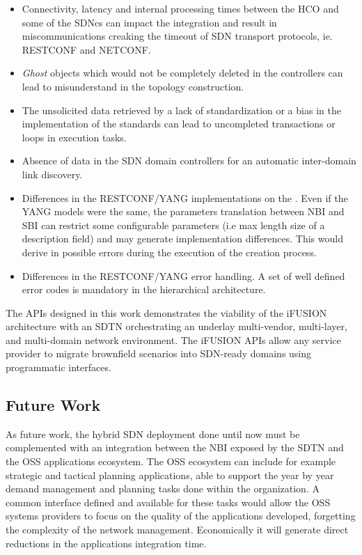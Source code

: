 \documentclass[10pt, conference]{IEEEtran}
\begin{document}
\begin{itemize}
    \item Connectivity, latency and internal processing times between the HCO and some of the SDNcs can impact the integration and result in miscommunications creaking the timeout of SDN transport protocols, ie. RESTCONF and NETCONF.   
    \item \textit{Ghost} objects which would not be completely deleted in the controllers can lead to misunderstand in the topology construction.
    \item The unsolicited data retrieved by a lack of standardization or a bias in the implementation of the standards can lead to uncompleted transactions or loops in execution tasks.
    \item Absence of data in the SDN domain controllers for an automatic inter-domain link discovery.
    \item Differences in the RESTCONF/YANG implementations on the . Even if the YANG models were the same, the parameters translation between NBI and SBI can restrict some configurable parameters (i.e max length size of a description field) and may generate implementation differences. This would derive in possible errors during the execution of the creation process.
    \item Differences in the RESTCONF/YANG error handling. A set of well defined error codes is mandatory in the hierarchical architecture.
\end{itemize}

The APIs designed in this work demonstrates the viability of the i\uppercase{FUSION} architecture with an SDTN  orchestrating an underlay multi-vendor, multi-layer, and multi-domain network environment. The i\uppercase{FUSION} APIs allow any service provider to migrate brownfield scenarios into SDN-ready domains using programmatic interfaces.

\subsection{Future Work}
As future work, the hybrid SDN deployment done until now must be complemented with an integration between the NBI exposed by the SDTN  and the OSS applications ecosystem. The OSS ecosystem can include for example strategic and tactical planning applications, able to support the year by year demand management and planning tasks done within the organization. A common interface defined and available for these tasks would allow the OSS systems providers to focus on the quality of the applications developed, forgetting the complexity of the network management. Economically it will generate direct reductions in the applications integration time.
\end{document}
